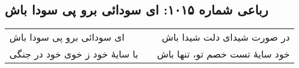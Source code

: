\begin{center}
\section*{رباعی شماره ۱۰۱۵: ای سودائی برو پی سودا باش}
\label{sec:1015}
\begin{longtable}{l p{0.5cm} r}
ای سودائی برو پی سودا باش
&&
در صورت شیدای دلت شیدا باش
\\
با سایهٔ خود ز خوی خود در جنگی
&&
خود سایهٔ تست خصم تو، تنها باش
\\
\end{longtable}
\end{center}
